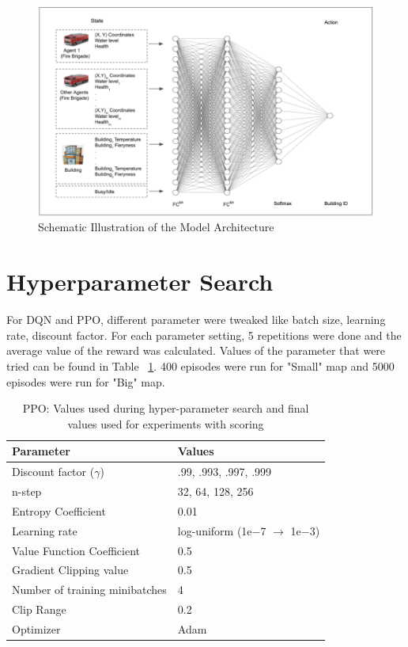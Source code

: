 \documentclass[12pt]{report}
\begin{document}
\begin{figure}[!h]
    \centering
    \includegraphics[width=17cm]{27}
    \caption{Schematic Illustration of the Model Architecture}
    \label{fig:27}
\end{figure}

\section{Hyperparameter Search}

For DQN and PPO, different parameter were tweaked like batch size, learning rate, discount factor. For each parameter setting, 5 repetitions were done and the average value of the reward was calculated. Values of the parameter that were tried can be found in Table ~\ref{table:DQNRangesHyperparameter}. 400 episodes were run for "Small" map and 5000 episodes were run for "Big" map. 

\begin{table} [!h]
\begin{center}
 \begin{tabular}{l | l} 
 \hline
 Parameter & Values \\ [0.5ex] 
 \hline\hline
 Discount factor ($\gamma$) & {.99, .993, .997, .999}\\
 n-step & {32, 64, 128, 256}\\
 Entropy Coefficient & 0.01\\
 Learning rate & log-uniform (1e−7 $\rightarrow$ 1e−3) \\
 Value Function Coefficient & 0.5 \\
 Gradient Clipping value & 0.5 \\
 Number of training minibatches & 4 \\
 Clip Range & 0.2\\
 Optimizer & Adam \\ 
 \hline
\end{tabular}
\caption{PPO: Values used during hyper-parameter search and final values used for experiments with scoring}
\label{table:DQNRangesHyperparameter}
\end{center}
\end{table}
\end{document}
